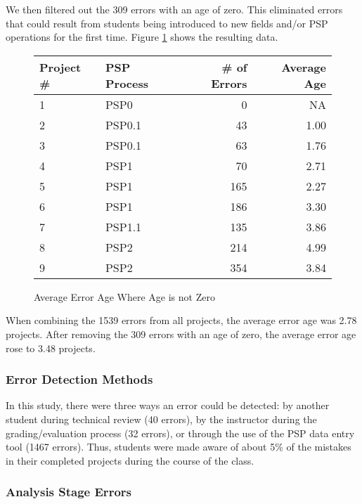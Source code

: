   We then filtered out the 309 errors with an age of zero.  This
  eliminated errors that could result from students being
  introduced to new fields and/or PSP operations for the first time.  
  Figure  \ref{errorAgeSome} shows the resulting data.

  \begin{figure} [htpb]
  \begin{center} 
  \begin{tabular}{|l|l|r|r|}\hline 
  Project \# & PSP Process & \# of Errors & Average Age \\ \hline\hline 
  1 & PSP0    &   0  &    NA \\ \hline 
  2 & PSP0.1  &  43  &  1.00 \\ \hline 
  3 & PSP0.1  &  63  &  1.76 \\ \hline
  4 & PSP1    &  70  &  2.71 \\ \hline
  5 & PSP1    & 165  &  2.27 \\ \hline
  6 & PSP1    & 186  &  3.30 \\ \hline
  7 & PSP1.1  & 135  &  3.86 \\ \hline
  8 & PSP2    & 214  &  4.99 \\ \hline
  9 & PSP2    & 354  &  3.84 \\ \hline
  \end{tabular}
  \end{center} 
  \caption{\label{errorAgeSome}Average Error Age Where Age is not Zero}
  \end{figure}
      
When combining the 1539 errors from all projects, the average error age
was 2.78 projects.  After removing the 309 errors with an age of zero,
the average error age rose to 3.48 projects.


\subsubsection{Error Detection Methods}

In this study, there were three ways an error could be detected: by another
student during technical review (40 errors), by the instructor during the
grading/evaluation process (32 errors), or through the use of the PSP data
entry tool (1467 errors).  Thus, students were made aware of about 5\% of
the mistakes in their completed projects during the course of the class.

\subsubsection{Analysis Stage Errors}

